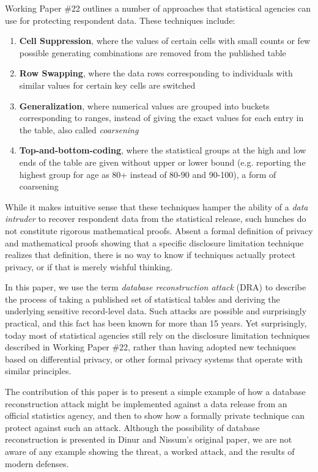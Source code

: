 \documentclass[runningheads]{llncs}
\newif\iflongversion
\newcommand{\citelong}[1]{}
\newcommand{\citelong}[1]{\cite{#1}}
\begin{document}
Working Paper \#22 outlines a number of approaches that statistical
agencies can use for protecting respondent data. These techniques include:
\begin{enumerate}
  \item \textbf{Cell Suppression}, where the values of certain  cells with small counts or few possible
        generating combinations are removed from the published table
  \item \textbf{Row Swapping}, where the data rows corresponding to individuals
        with similar values for certain key cells are switched
  \item \textbf{Generalization}, where numerical values are grouped into
        buckets corresponding to ranges, instead of giving the exact
        values for each entry in the table, also called \emph{coarsening}
  \item \textbf{Top-and-bottom-coding}, where the statistical groups at the high and low ends
        of the table are given without upper or lower bound (e.g.
        reporting the highest group for age as 80+ instead of
        80-90 and 90-100), a form of coarsening
\end{enumerate}

While it makes intuitive sense that these techniques hamper the
ability of a  \emph{data intruder}\citelong{data-intruder} to recover respondent data from the
statistical release, such hunches do not constitute rigorous
mathematical proofs. Absent a formal definition of privacy and
mathematical proofs showing that a specific disclosure limitation
technique realizes that definition, there is no way to know if
techniques actually protect privacy, or if that is merely wishful thinking.

In this paper, we use
the term \emph{database reconstruction attack} (DRA) to describe the process of
taking a published set of statistical tables and deriving the
underlying sensitive record-level data. Such attacks are possible and surprisingly
practical, and this fact has been known for more than 15
years\cite{noise}. Yet surprisingly, today most of
statistical agencies still rely on the disclosure
limitation techniques described in Working Paper \#22, rather than
having adopted new techniques based on differential
privacy\cite{Dwork:2006:CNS:2180286.2180305}, or other formal privacy systems 
that operate with similar principles\cite{KiferMachanavajjhala:2012}.

The contribution of this paper is to present a simple example of how
a database reconstruction attack might be implemented against a data
release from an official statistics agency, and then to show how a
formally private technique can protect against such an
attack. Although the possibility of database reconstruction is
presented in Dinur and Nissum's original paper\cite{noise}, we are not
aware of any \iflongversion end-to-end \fi example showing the threat, a worked attack,
and the results of modern defenses.
\end{document}
